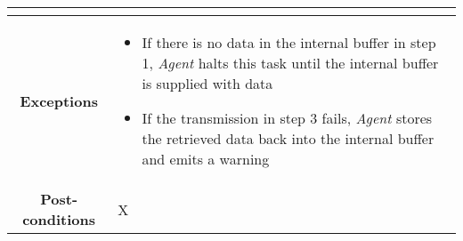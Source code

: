 \begin{longtable}{ |c|p{11.8cm}| }
{\begin{itemize}
                    \end{itemize}
                }\\ \hline
                \cellcolor[gray]{0.9} \textbf{Exceptions} & 
                    \begin{itemize}
                        \item If there is no data in the internal buffer in step 1, \textit{Agent} halts this task until the internal buffer is supplied with data
                        \item If the transmission in step 3 fails, \textit{Agent} stores the retrieved data back into the internal buffer and emits a warning
                    \end{itemize}\\ \hline
                \cellcolor[gray]{0.9} \textbf{Post-conditions} & X\\ \hline
            \end{longtable}

